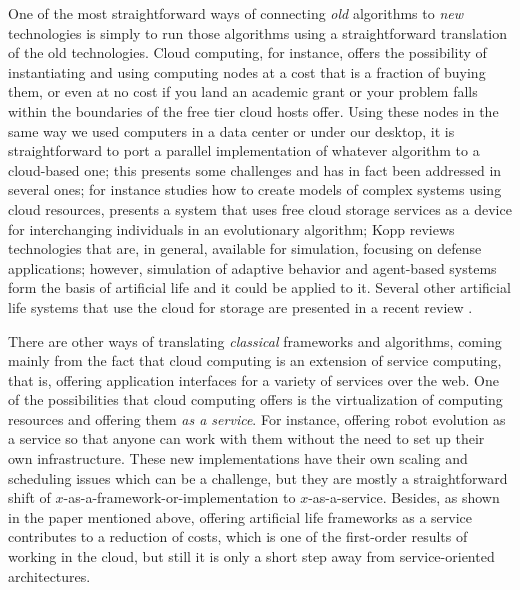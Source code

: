 \documentclass[utf8]{frontiersSCNS} %
\begin{document}
One of the most straightforward ways of connecting {\em old} algorithms to
{\em new} technologies is simply to run those algorithms using a
straightforward translation of the old technologies. Cloud computing,
for instance, offers the possibility of instantiating and using computing nodes
at a cost that is a fraction of buying them, or even at no cost if you
land an academic grant or your problem falls within the boundaries of
the free tier cloud hosts offer. Using these nodes in the same way we
used computers in a data center or under our desktop, it is
straightforward to port a parallel implementation of
whatever algorithm to a cloud-based one; this presents some challenges and
has in fact been addressed in several ones; for instance \citep{Medel2017}
studies how to create models of complex systems using cloud resources,
\cite{mericloud} presents a system that uses free cloud
storage services as a device for interchanging individuals in an
evolutionary algorithm; Kopp \citep{Kopp2016} reviews technologies
that are, in general, available for simulation, focusing on defense
applications; however, simulation of adaptive behavior and agent-based
systems form the basis of artificial life and it could be applied to
it. Several other artificial life systems that use
the cloud for storage are presented in a recent review
\citep{taylor2016webal}.


There are other ways of translating {\em classical} frameworks and
algorithms, coming mainly from the fact that cloud computing is an
extension of service computing, that is, offering application
interfaces for a variety of services over the web. One of the possibilities that cloud computing offers
is the virtualization of computing resources and offering them {\em as a
service}. For instance, offering robot evolution as a service
\citep{du2017robot,chen2010robot} so that anyone can work with them without the
need to set up their own infrastructure. These new
implementations have their own scaling and scheduling issues which can
be a challenge, but they are mostly a straightforward shift
of $x$-as-a-framework-or-implementation to $x$-as-a-service. Besides,
as shown in the paper mentioned above, offering artificial life
frameworks as a service contributes to a
reduction of costs, which is one of the first-order results of working
in the cloud, but still it is only a short step away from
service-oriented architectures.
\end{document}
